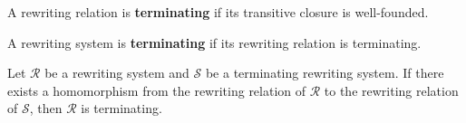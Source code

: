 \documentclass{book}
\begin{document}
      
    \begin{definition}
        \label{def:rewriting_relation:termination}
    A rewriting relation is \textbf{terminating} if its transitive closure is well-founded.
    \end{definition}
    
    \begin{definition}
        \label{def:rewriting_system:termination}
        A rewriting system 
         is \textbf{terminating} if its rewriting relation
          is terminating.
    \end{definition}
    
    \begin{proposition}
        Let $\mathcal{R}$ be a rewriting system and $\mathcal{S}$ be a terminating rewriting system.
        If there exists a homomorphism from the rewriting relation of $\mathcal{R}$ to the rewriting relation of $\mathcal{S}$, then $\mathcal{R}$ is terminating.  
    \end{proposition}
    
\end{document}
